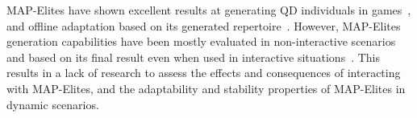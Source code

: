 


MAP-Elites have shown excellent results at generating QD individuals in games~\cite{p9fontaine2019covariance,Alvarez2020-ICMAPE}, and offline adaptation based on its generated repertoire~\cite{p9Cully2015-qdRobotsAnimals,Gonzalez-Duque2020-DifficultyTrialError}. However, MAP-Elites generation capabilities have been mostly evaluated in non-interactive scenarios and based on its final result even when used in interactive situations~\cite{p9charity2020baba,alvarez2019empowering}. This results in a lack of research to assess the effects and consequences of interacting with MAP-Elites, and the adaptability and stability properties of MAP-Elites in dynamic scenarios. 

